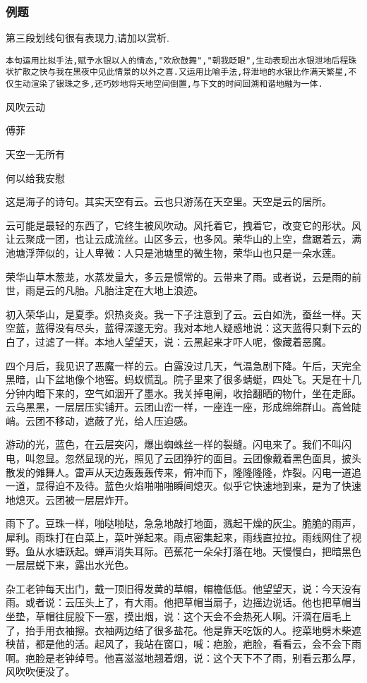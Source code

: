 \documentclass{ctexart}
\newcommand{\nm}{\normalsize}
\renewcommand{\\}{\par}
\begin{document}
\subsubsection{例题}
第三段划线句很有表现力,请加以赏析.\\
\texttt{本句运用比拟手法,赋予水银以人的情态,"欢欣鼓舞","朝我眨眼",生动表现出水银泄地后程珠状扩散之快与我在黑夜中见此情景的以外之喜.又运用比喻手法,将泄地的水银比作满天繁星,不仅生动渲染了银珠之多,还巧妙地将天地空间倒置,与下文的时间回溯和谐地融为一体.}\\
\nm \fangsong
\centerline{风吹云动}\\
\centerline{傅菲}\\
\\天空一无所有
\\何以给我安慰
\\这是海子的诗句。其实天空有云。云也只游荡在天空里。天空是云的居所。
\\云可能是最轻的东西了，它终生被风吹动。风托着它，拽着它，改变它的形状。风让云聚成一团，也让云成流丝。山区多云，也多风。荣华山的上空，盘踞着云，满池塘浮萍似的，让人卑微：人只是池塘里的微生物，荣华山也只是一朵水莲。
\\荣华山草木葱茏，水蒸发量大，多云是惯常的。云带来了雨。或者说，云是雨的前世，雨是云的凡胎。凡胎注定在大地上浪迹。
\\初入荣华山，是夏季。炽热炎炎。我一下子注意到了云。云白如洗，蚕丝一样。天空蓝，蓝得没有尽头，蓝得深邃无穷。我对本地人疑惑地说：这天蓝得只剩下云的白了，过滤了一样。本地人望望天，说：云黑起来才吓人呢，像藏着恶魔。
\\四个月后，我见识了恶魔一样的云。白露没过几天，气温急剧下降。午后，天完全黑暗，山下盆地像个地窖。蚂蚁慌乱。院子里来了很多蜻蜓，四处飞。天是在十几分钟内暗下来的，空气如洇开了墨水。我关掉电闸，收拾翻晒的物什，坐在走廊。云乌黑黑，一层层压实铺开。云团山峦一样，一座连一座，形成绵绵群山。高耸陡峭。云团不移动，遮蔽了光，给人压迫感。
\\游动的光，蓝色，在云层突闪，爆出蜘蛛丝一样的裂缝。闪电来了。我们不叫闪电，叫忽显。忽然显现的光，照见了云团狰狞的面目。云团像戴着黑色面具，披头散发的傩舞人。雷声从天边轰轰轰传来，俯冲而下，隆隆隆隆，炸裂。闪电一道追一道，显得迫不及待。蓝色火焰啪啪啪瞬间熄灭。似乎它快速地到来，是为了快速地熄灭。云团被一层层炸开。
\\雨下了。豆珠一样，啪哒啪哒，急急地敲打地面，溅起干燥的灰尘。脆脆的雨声，犀利。雨珠打在白菜上，菜叶弹起来。雨点密集起来，雨线直拉拉。雨线网住了视野。鱼从水塘跃起。蝉声消失耳际。芭蕉花一朵朵打落在地。天慢慢白，把暗黑色一层层蜕下来，露出水光色。
\\杂工老钟每天出门，戴一顶旧得发黄的草帽，帽檐低低。他望望天，说：今天没有雨。或者说：云压头上了，有大雨。他把草帽当扇子，边摇边说话。他也把草帽当坐垫，草帽往屁股下一塞，摸出烟，说：这个天会不会热死人啊。汗滴在眉毛上了，抬手用衣袖擦。衣袖两边结了很多盐花。他是靠天吃饭的人。挖菜地劈木柴遮秧苗，都是他的活。起风了，我站在窗口，喊：疤脸，疤脸，看看云，会不会下雨啊。疤脸是老钟绰号。他喜滋滋地翘着烟，说：这个天下不了雨，别看云那么厚，风吹吹便没了。
\end{document}

